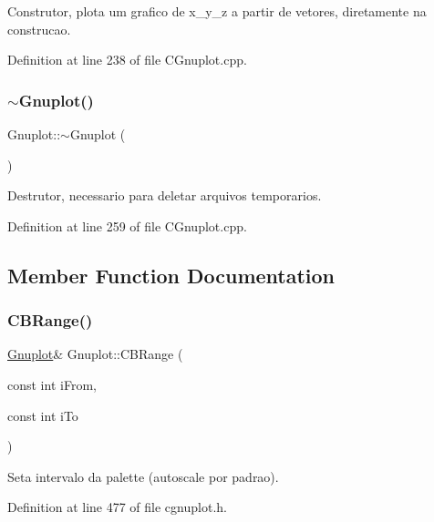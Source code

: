 Construtor, plota um grafico de x\+\_\+y\+\_\+z a partir de vetores, diretamente na construcao. 



Definition at line 238 of file C\+Gnuplot.\+cpp.

\mbox{\label{class_gnuplot_a78a68f621caa87d1f34324fcd093c7bd}} 
\subsubsection{\texorpdfstring{$\sim$\+Gnuplot()}{~Gnuplot()}}
{\footnotesize\ttfamily Gnuplot\+::$\sim$\+Gnuplot (\begin{DoxyParamCaption}{ }\end{DoxyParamCaption})}



Destrutor, necessario para deletar arquivos temporarios. 



Definition at line 259 of file C\+Gnuplot.\+cpp.



\subsection{Member Function Documentation}
\mbox{\label{class_gnuplot_ab5b863b17dcc767214e472330bceedca}} 
\subsubsection{\texorpdfstring{C\+B\+Range()}{CBRange()}}
{\footnotesize\ttfamily \hyperlink{class_gnuplot}{Gnuplot}\& Gnuplot\+::\+C\+B\+Range (\begin{DoxyParamCaption}\item[{const int}]{i\+From,  }\item[{const int}]{i\+To }\end{DoxyParamCaption})\hspace{0.3cm}{\ttfamily [inline]}}



Seta intervalo da palette (autoscale por padrao). 



Definition at line 477 of file cgnuplot.\+h.

